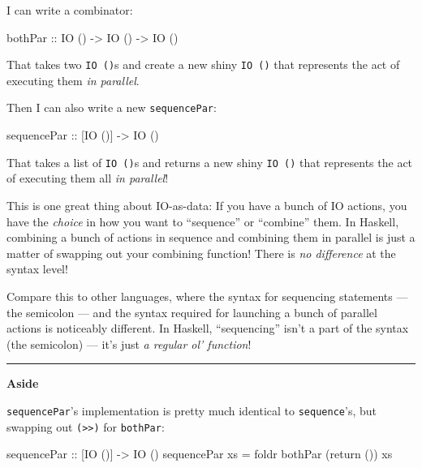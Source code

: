 \documentclass[]{article}
\newenvironment{Shaded}{}{}
\newcommand{\DataTypeTok}[1]{\textcolor[rgb]{0.56,0.13,0.00}{#1}}
\newcommand{\FunctionTok}[1]{\textcolor[rgb]{0.02,0.16,0.49}{#1}}
\newcommand{\NormalTok}[1]{#1}
\newcommand{\OtherTok}[1]{\textcolor[rgb]{0.00,0.44,0.13}{#1}}
\begin{document}
I can write a combinator:

\begin{Shaded}
\begin{Highlighting}[]
\OtherTok{bothPar ::} \DataTypeTok{IO}\NormalTok{ () }\OtherTok{->} \DataTypeTok{IO}\NormalTok{ () }\OtherTok{->} \DataTypeTok{IO}\NormalTok{ ()}
\end{Highlighting}
\end{Shaded}

That takes two \texttt{IO\ ()}s and create a new shiny \texttt{IO\ ()} that
represents the act of executing them \emph{in parallel}.

Then I can also write a new \texttt{sequencePar}:

\begin{Shaded}
\begin{Highlighting}[]
\OtherTok{sequencePar ::}\NormalTok{ [}\DataTypeTok{IO}\NormalTok{ ()] }\OtherTok{->} \DataTypeTok{IO}\NormalTok{ ()}
\end{Highlighting}
\end{Shaded}

That takes a list of \texttt{IO\ ()}s and returns a new shiny \texttt{IO\ ()}
that represents the act of executing them all \emph{in parallel}!

This is one great thing about IO-as-data: If you have a bunch of IO actions, you
have the \emph{choice} in how you want to ``sequence'' or ``combine'' them. In
Haskell, combining a bunch of actions in sequence and combining them in parallel
is just a matter of swapping out your combining function! There is \emph{no
difference} at the syntax level!

Compare this to other languages, where the syntax for sequencing statements ---
the semicolon --- and the syntax required for launching a bunch of parallel
actions is noticeably different. In Haskell, ``sequencing'' isn't a part of the
syntax (the semicolon) --- it's just \emph{a regular ol' function}!

\begin{center}\rule{0.5\linewidth}{\linethickness}\end{center}

\textbf{Aside}

\texttt{sequencePar}'s implementation is pretty much identical to
\texttt{sequence}'s, but swapping out \texttt{(\textgreater{}\textgreater{})}
for \texttt{bothPar}:

\begin{Shaded}
\begin{Highlighting}[]
\OtherTok{sequencePar ::}\NormalTok{ [}\DataTypeTok{IO}\NormalTok{ ()] }\OtherTok{->} \DataTypeTok{IO}\NormalTok{ ()}
\NormalTok{sequencePar xs }\FunctionTok{=}\NormalTok{ foldr bothPar (return ()) xs}
\end{Highlighting}
\end{Shaded}
\end{document}
